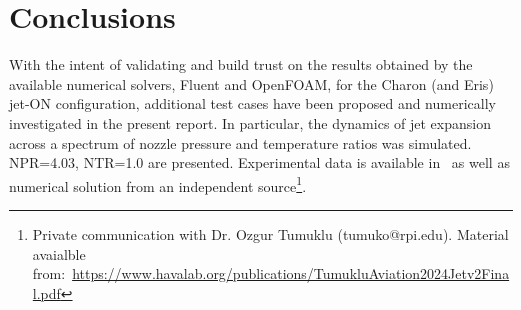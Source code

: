 \documentclass[12pt]{article}
\begin{document}
%
%
%
%

\section{Conclusions}\label{sec:conclusions}
With the intent of validating and build trust on the results obtained by the available numerical solvers, Fluent and OpenFOAM, for the Charon (and Eris) jet-ON configuration, additional test cases have been proposed and numerically investigated in the present report. In particular, the dynamics of jet expansion across a spectrum of nozzle pressure and temperature ratios was simulated.
NPR=4.03, NTR=1.0 are presented. Experimental data is available in~\cite{henderson2005experimental} as well as numerical solution from an independent source\footnote{Private communication with Dr. Ozgur Tumuklu (tumuko@rpi.edu). Material avaialble from:~\url{https://www.havalab.org/publications/TumukluAviation2024Jetv2Final.pdf}}.
\end{document}
